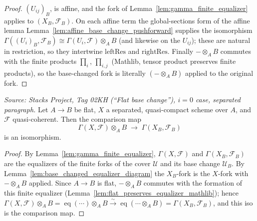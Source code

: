 \begin{lemma}
\begin{proof}
    \((U_{ij})_B\), is affine, and the fork of
    Lemma~\ref{lem:gamma_finite_equalizer} applies to \((X_B,\mathcal{F}_B)\). On each
    affine term the global-sections form of the affine lemma
    Lemma~\ref{lem:affine_base_change_pushforward} supplies the isomorphism
    \(\Gamma((U_i)_B,\mathcal{F}_B) \cong \Gamma(U_i,\mathcal{F}) \otimes_A B\)
    (and likewise on the \(U_{ij}\)); these are natural in restriction, so they
    intertwine \(\mathrm{leftRes}\) and \(\mathrm{rightRes}\). Finally
    \(- \otimes_A B\) commutes with the finite products \(\prod_i\), \(\prod_{i,j}\)
    (Mathlib, tensor product preserves finite products), so the base-changed fork is
    literally \((- \otimes_A B)\) applied to the original fork.
  \end{proof}
\end{lemma}

\begin{lemma}
  \label{lem:flat_base_change_separated}
  \textit{Source: Stacks Project, Tag 02KH (``Flat base change''), $i=0$ case,
  separated paragraph.}
  Let \(A \to B\) be flat, \(X\) a separated, quasi-compact scheme over \(A\), and
  \(\mathcal{F}\) quasi-coherent. Then the comparison map
  \[
    \Gamma(X, \mathcal{F}) \otimes_A B \;\longrightarrow\; \Gamma(X_B, \mathcal{F}_B)
  \]
  is an isomorphism.
  \begin{proof}
    By Lemma~\ref{lem:gamma_finite_equalizer}, \(\Gamma(X,\mathcal{F})\) and
    \(\Gamma(X_B,\mathcal{F}_B)\) are the equalizers of the finite forks of the cover
    \(\mathcal{U}\) and its base change \(\mathcal{U}_B\). By
    Lemma~\ref{lem:base_changed_equalizer_diagram} the \(X_B\)-fork is the
    \(X\)-fork with \(- \otimes_A B\) applied. Since \(A \to B\) is flat,
    \(- \otimes_A B\) commutes with the formation of this finite equalizer
    (Lemma~\ref{lem:flat_preserves_equalizer_mathlib}); hence
    \(\Gamma(X,\mathcal{F}) \otimes_A B = \operatorname{eq}(\cdots) \otimes_A B
    \xrightarrow{\sim} \operatorname{eq}(\cdots \otimes_A B) = \Gamma(X_B,\mathcal{F}_B)\),
    and this iso is the comparison map.
  \end{proof}
\end{lemma}

